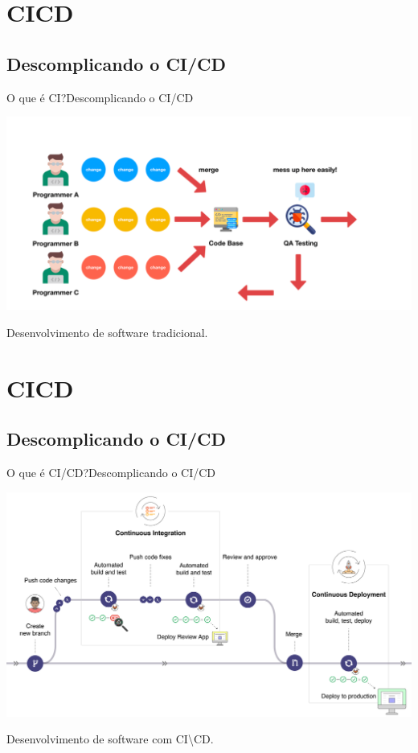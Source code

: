 \documentclass[10pt]{beamer}
\begin{document}
\section{CICD}
\subsection{Descomplicando o CI/CD}
\begin{frame}{O que é CI?}{Descomplicando o CI/CD}
  \begin{center}
    \includegraphics[scale=0.25]{images/traditional.png}
  \end{center}
  \begin{center}
      Desenvolvimento de software tradicional.
   \end{center}
\end{frame}

\section{CICD}
\subsection{Descomplicando o CI/CD}
\begin{frame}{O que é CI/CD?}{Descomplicando o CI/CD}
  \begin{center}
    \includegraphics[scale=0.09]{images/workflow.png}
  \end{center}
  \begin{center}
      Desenvolvimento de software com CI\textbackslash CD.
   \end{center}
\end{frame}
\end{document}
